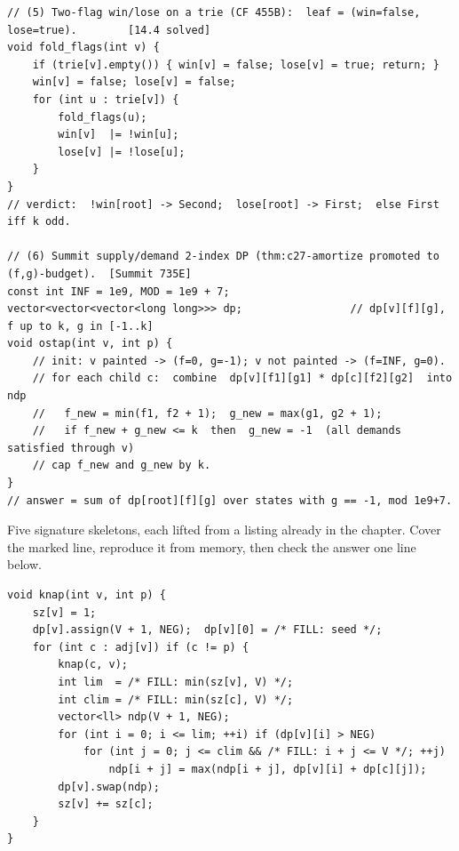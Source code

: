 \begin{lstlisting}
// (5) Two-flag win/lose on a trie (CF 455B):  leaf = (win=false, lose=true).        [14.4 solved]
void fold_flags(int v) {
    if (trie[v].empty()) { win[v] = false; lose[v] = true; return; }
    win[v] = false; lose[v] = false;
    for (int u : trie[v]) {
        fold_flags(u);
        win[v]  |= !win[u];
        lose[v] |= !lose[u];
    }
}
// verdict:  !win[root] -> Second;  lose[root] -> First;  else First iff k odd.

// (6) Summit supply/demand 2-index DP (thm:c27-amortize promoted to (f,g)-budget).  [Summit 735E]
const int INF = 1e9, MOD = 1e9 + 7;
vector<vector<vector<long long>>> dp;                 // dp[v][f][g], f up to k, g in [-1..k]
void ostap(int v, int p) {
    // init: v painted -> (f=0, g=-1); v not painted -> (f=INF, g=0).
    // for each child c:  combine  dp[v][f1][g1] * dp[c][f2][g2]  into ndp
    //   f_new = min(f1, f2 + 1);  g_new = max(g1, g2 + 1);
    //   if f_new + g_new <= k  then  g_new = -1  (all demands satisfied through v)
    // cap f_new and g_new by k.
}
// answer = sum of dp[root][f][g] over states with g == -1, mod 1e9+7.
\end{lstlisting}



Five signature skeletons, each lifted from a listing already in the
chapter. Cover the marked line, reproduce it from memory, then check the
answer one line below.

\begin{lstlisting}[caption={Drill 1 -- the capped child-merge (from \coderef{c27-knap})}]
void knap(int v, int p) {
    sz[v] = 1;
    dp[v].assign(V + 1, NEG);  dp[v][0] = /* FILL: seed */;
    for (int c : adj[v]) if (c != p) {
        knap(c, v);
        int lim  = /* FILL: min(sz[v], V) */;
        int clim = /* FILL: min(sz[c], V) */;
        vector<ll> ndp(V + 1, NEG);
        for (int i = 0; i <= lim; ++i) if (dp[v][i] > NEG)
            for (int j = 0; j <= clim && /* FILL: i + j <= V */; ++j)
                ndp[i + j] = max(ndp[i + j], dp[v][i] + dp[c][j]);
        dp[v].swap(ndp);
        sz[v] += sz[c];
    }
}
\end{lstlisting}

